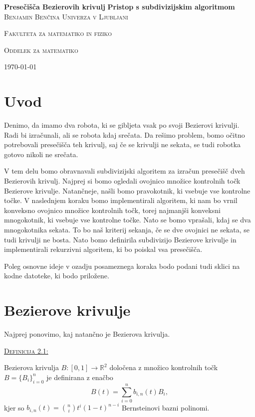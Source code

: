 \documentclass[a4paper, 12pt]{article} %
\newenvironment{matematika}[1]{
{\underline{\textsc{#1:}}}
}{
}
\begin{document}
\begin{titlepage}
\centering
\textbf{\Huge{Presečišča Bezierovih krivulj}}
\vfill
\textbf{\LARGE{Pristop s subdivizijskim algoritmom}}
\vfill\vfill
\textsc{\Large{Benjamin Benčina}}
\vfill\vfill
\textsc{\large{Univerza v Ljubljani}}

\textsc{\large{Fakulteta za matematiko in fiziko}}

\textsc{\large{Oddelek za matematiko}}
\vfill\vfill\vfill
	
{\large\today}

\end{titlepage}

\tableofcontents
\newpage

\section{Uvod}

Denimo, da imamo dva robota, ki se gibljeta vsak po svoji Bezierovi krivulji. Radi bi izračunali, ali se robota kdaj srečata. Da rešimo problem, bomo očitno potrebovali presečišča teh krivulj, saj če se krivulji ne sekata, se tudi robotka gotovo nikoli ne srečata.

V tem delu bomo obravnavali subdivizijski algoritem za izračun presečišč dveh Bezierovih krivulj. Najprej si bomo ogledali ovojnico množice kontrolnih točk Bezierove krivulje. Natančneje, našli bomo pravokotnik, ki vsebuje vse kontrolne točke. V naslednjem koraku bomo implementirali algoritem, ki nam bo vrnil konveksno ovojnico množice kontrolnih točk, torej najmanjši konveksni mnogokotnik, ki vsebuje vse kontrolne točke. Nato se bomo vprašali, kdaj se dva mnogokotnika sekata. To bo naš kriterij sekanja, če se dve ovojnici ne sekata, se tudi krivulji ne bosta. Nato bomo definirila subdivizijo Bezierove krivulje in implementirali rekurzivni algoritem, ki bo poiskal vsa presečišča.

Poleg osnovne ideje v ozadju posameznega koraka bodo podani tudi sklici na kodne datoteke, ki bodo priložene.

\section{Bezierove krivulje}

Najprej ponovimo, kaj natančno je Bezierova krivulja.

\begin{matematika}{Definicija 2.1}
Bezierova krivulja $B\colon [0, 1] \to \mathbb{R}^2$ določena z množico kontrolnih točk $B = \lbrace B_i \rbrace_{i = 0}^n$ je definirana z enačbo
\[ B(t) = \sum_{i = 0}^n b_{i,n}(t)B_i, \]
kjer so $b_{i,n}(t) = \binom{n}{i}t^{i}(1-t)^{n-i}$ Bernsteinovi bazni polinomi.
\end{matematika}
\end{document}
